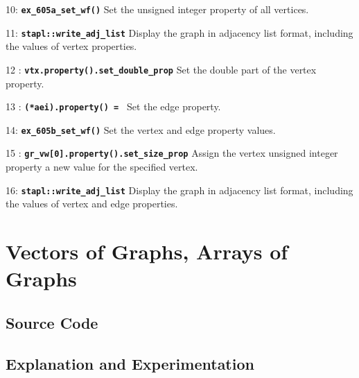 \documentclass{report}
\begin{document}
\begin{hashitemize}
\item 10: \texttt{{\bf ex\_605a\_set\_wf()}}
\newline
Set the unsigned integer property of all vertices.

\item 11: \texttt{{\bf stapl::write\_adj\_list}}
\newline
Display the graph in adjacency list format, including the values of
vertex properties.

\item 12 : \texttt{{\bf vtx.property().set\_double\_prop}}
\newline
Set the double part of the vertex property.

\item 13 : \texttt{{\bf (*aei).property() = }}
\newline
Set the edge property.

\item 14: \texttt{{\bf ex\_605b\_set\_wf()}}
\newline
Set the vertex and edge property values.

\item 15 : \texttt{{\bf gr\_vw[0].property().set\_size\_prop}}
\newline
Assign the vertex unsigned integer property a new value
for the specified vertex.

\item 16: \texttt{{\bf stapl::write\_adj\_list}}
\newline
Display the graph in adjacency list format, including the values of
vertex and edge properties.

\end{hashitemize}


\pagebreak
\section{Vectors of Graphs, Arrays of Graphs}

\subsection{Source Code}



\subsection{Explanation and Experimentation}
\end{document}
